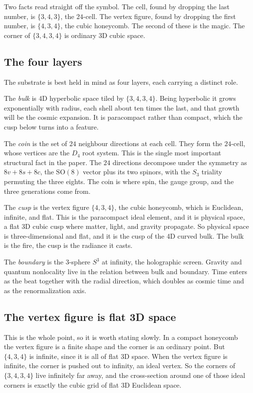 Two facts read straight off the symbol. The cell, found by dropping the last number, is $\{3,4,3\}$, the $24$-cell. The vertex figure, found by dropping the first number, is $\{4,3,4\}$, the cubic honeycomb. The second of these is the magic. The corner of $\{3,4,3,4\}$ is ordinary 3D cubic space.

\subsection{The four layers}

The substrate is best held in mind as four layers, each carrying a distinct role.

The \emph{bulk} is 4D hyperbolic space tiled by $\{3,4,3,4\}$. Being hyperbolic it grows exponentially with radius, each shell about ten times the last, and that growth will be the cosmic expansion. It is paracompact rather than compact, which the cusp below turns into a feature.

The \emph{coin} is the set of $24$ neighbour directions at each cell. They form the $24$-cell, whose vertices are the $D_4$ root system. This is the single most important structural fact in the paper. The $24$ directions decompose under the symmetry as $8v + 8s + 8c$, the $\mathrm{SO}(8)$ vector plus its two spinors, with the $S_3$ triality permuting the three eights. The coin is where spin, the gauge group, and the three generations come from.

The \emph{cusp} is the vertex figure $\{4,3,4\}$, the cubic honeycomb, which is Euclidean, infinite, and flat. This is the paracompact ideal element, and it is physical space, a flat 3D cubic cusp where matter, light, and gravity propagate. So physical space is three-dimensional and flat, and it is the cusp of the 4D curved bulk. The bulk is the fire, the cusp is the radiance it casts.

The \emph{boundary} is the $3$-sphere $S^3$ at infinity, the holographic screen. Gravity and quantum nonlocality live in the relation between bulk and boundary. Time enters as the beat together with the radial direction, which doubles as cosmic time and as the renormalization axis.

\subsection{The vertex figure is flat 3D space}

This is the whole point, so it is worth stating slowly. In a compact honeycomb the vertex figure is a finite shape and the corner is an ordinary point. But $\{4,3,4\}$ is infinite, since it is all of flat 3D space. When the vertex figure is infinite, the corner is pushed out to infinity, an ideal vertex. So the corners of $\{3,4,3,4\}$ live infinitely far away, and the cross-section around one of those ideal corners is exactly the cubic grid of flat 3D Euclidean space.

